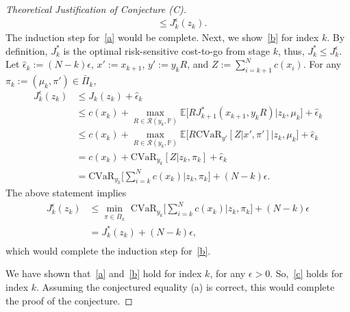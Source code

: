 \documentclass[letterpaper, 10 pt, conference]{ieeeconf}  %
\begin{document}
\begin{proof}[Theoretical Justification of Conjecture (C)]
\begin{equation*}
\begin{aligned}
& \leq J_k^\epsilon(z_k). \end{aligned}\end{equation*}
%
The induction step for~\eqref{a} would be complete. Next, we show~\eqref{b} for index $k$. By definition, $J_k^*$ is the optimal risk-sensitive cost-to-go from stage $k$, thus, $J_k^* \leq J_k^\epsilon$.
Let $\hat{\epsilon}_k := (N-k)\epsilon$, $x':=x_{k+1}$, $y' := y_kR$, and $Z := \sum_{i=k+1}^N c(x_i)$. For any $\pi_k := (\mu_k, \pi') \in \bar{\Pi}_k$,
%
\begin{equation*}\begin{aligned}
J_k^\epsilon(z_k) & \leq J_k(z_k) + \hat{\epsilon}_k \\
& \leq c(x_k) + {\underset{R \in \mathcal{R}(y_k, \mathbb{P})}\max} \mathbb{E}\big[ RJ_{k+1}^*(x_{k+1},y_kR) \big| z_k, \mu_k \big] + \hat{\epsilon}_k\\
& \leq c(x_k) + {\underset{R \in \mathcal{R}(y_k, \mathbb{P})}\max} \mathbb{E}\big[ R\text{CVaR}_{y'} [Z|x', \pi' ] \big| z_k, \mu_k \big] + \hat{\epsilon}_k\\
& = c(x_k) + \text{CVaR}_{y_k}[Z|z_k, \pi_k] + \hat{\epsilon}_k\\
& = \text{CVaR}_{y_k}\big[\textstyle \sum_{i=k}^N c(x_k)|z_k, \pi_k\big] + (N-k)\epsilon.
\end{aligned}\end{equation*}
%
The above statement implies
%
\begin{equation*}\begin{aligned}
J_k^\epsilon(z_k) & \leq {\underset{\pi \in \bar{\Pi}_k} \min} \text{ CVaR}_{y_k}\big[\textstyle \sum_{i=k}^N c(x_k)|z_k, \pi_k\big] + (N-k)\epsilon \\
& = J_k^*(z_k) + (N-k)\epsilon, \\
\end{aligned}\end{equation*}
%
which would complete the induction step for~\eqref{b}. 

We have shown that~\eqref{a} and~\eqref{b} hold for index $k$, for any $\epsilon>0$. So,~\eqref{c} holds for index $k$. 
Assuming the conjectured equality (a) is correct, this would complete the proof of the conjecture.
\end{proof}
\addtolength{\textheight}{-2cm}   %


\end{document}
